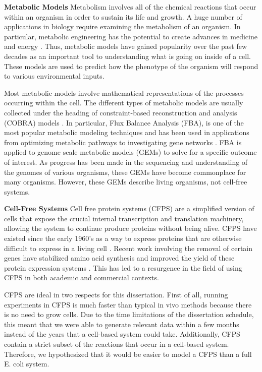 \textbf{Metabolic Models}
Metabolism involves all of the chemical reactions that occur within an organism in order to sustain its life and growth.
A huge number of applications in biology require examining the metabolism of an organism.
In particular, metabolic engineering has the potential to create advances in medicine and energy \cite{keasling2012synthetic}.
Thus, metabolic models have gained popularity over the past few decades as an important tool to understanding what is going on inside of a cell.
These models are used to predict how the phenotype of the organism will respond to various environmental inputs.

Most metabolic models involve mathematical representations of the processes occurring within the cell.
The different types of metabolic models are usually collected under the heading of constraint-based reconstruction and analysis (COBRA) models \cite{schellenberger2011quantitative}.
In particular, Flux Balance Analysis (FBA), is one of the most popular metabolic modeling techniques and has been used in applications from optimizing metabolic pathways \cite{almaas2004global} to investigating gene networks \cite{shlomi2007genome}.
FBA is applied to genome scale metabolic models (GEMs) to solve for a specific outcome of interest.
As progress has been made in the sequencing and understanding of the genomes of various organisms, these GEMs have become commonplace for many organisms.
However, these GEMs describe living organisms, not cell-free systems.

\textbf{Cell-Free Systems}
Cell free protein systems (CFPS) are a simplified version of cells that expose the crucial internal transcription and translation machinery, allowing the system to continue produce proteins without being alive.
CFPS have existed since the early 1960's as a way to express proteins that are otherwise difficult to express in a living cell \cite{nirenberg1961dependence}.
Recent work involving the removal of certain genes have stabilized amino acid synthesis and improved the yield of these protein expression systems \cite{calhoun2006total}.
This has led to a resurgence in the field of using CFPS in both academic and commercial contexts.

CFPS are ideal in two respects for this dissertation.
First of all, running experiments in CFPS is much faster than typical in vivo methods because there is no need to grow cells.
Due to the time limitations of the dissertation schedule, this meant that we were able to generate relevant data within a few months instead of the years that a cell-based system could take.
Additionally, CFPS contain a strict subset of the reactions that occur in a cell-based system.
Therefore, we hypothesized that it would be easier to model a CFPS than a full E. coli system.

